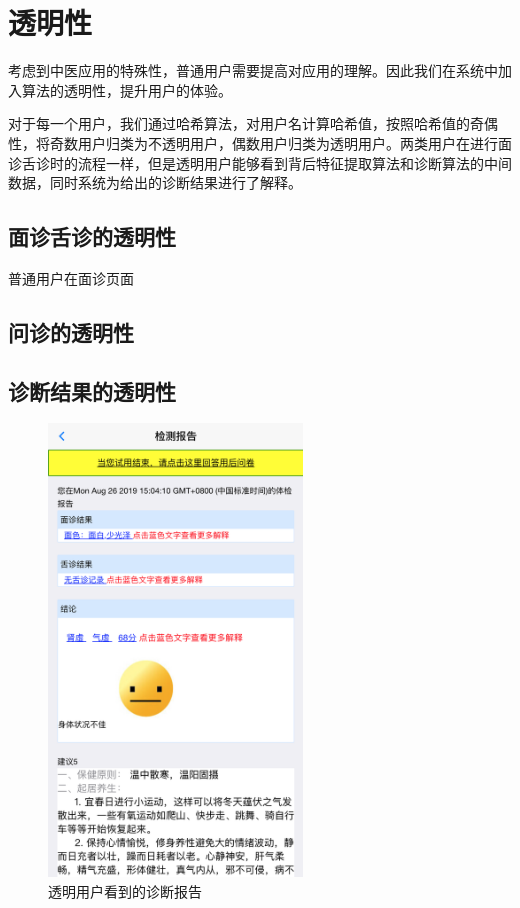 \section{透明性}
考虑到中医应用的特殊性，普通用户需要提高对应用的理解。因此我们在系统中加入算法的透明性，提升用户的体验。

对于每一个用户，我们通过哈希算法，对用户名计算哈希值，按照哈希值的奇偶性，将奇数用户归类为不透明用户，偶数用户归类为透明用户。两类用户在进行面诊舌诊时的流程一样，但是透明用户能够看到背后特征提取算法和诊断算法的中间数据，同时系统为给出的诊断结果进行了解释。

\subsection{面诊舌诊的透明性}
普通用户在面诊页面

\subsection{问诊的透明性}

\subsection{诊断结果的透明性}
\begin{figure}[ht]
    \centering
    \includegraphics[height=12cm]{images/report3.png}
    \caption{透明用户看到的诊断报告}
    \label{fig:my_label}
\end{figure}

